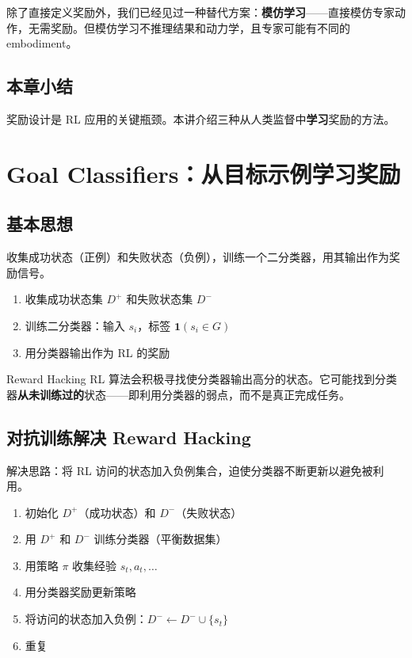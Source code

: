 \documentclass[a4paper]{article}
\begin{document}
除了直接定义奖励外，我们已经见过一种替代方案：\textbf{模仿学习}——直接模仿专家动作，无需奖励。但模仿学习不推理结果和动力学，且专家可能有不同的 embodiment。

\subsection{本章小结}

奖励设计是 RL 应用的关键瓶颈。本讲介绍三种从人类监督中\textbf{学习}奖励的方法。

\section{Goal Classifiers：从目标示例学习奖励}

\subsection{基本思想}

收集成功状态（正例）和失败状态（负例），训练一个二分类器，用其输出作为奖励信号。

\begin{enumerate}
    \item 收集成功状态集 $D^+$ 和失败状态集 $D^-$
    \item 训练二分类器：输入 $s_i$，标签 $\mathbf{1}(s_i \in G)$
    \item 用分类器输出作为 RL 的奖励
\end{enumerate}

\begin{warningbox}{Reward Hacking}
RL 算法会积极寻找使分类器输出高分的状态。它可能找到分类器\textbf{从未训练过的}状态——即利用分类器的弱点，而不是真正完成任务。
\end{warningbox}

\subsection{对抗训练解决 Reward Hacking}

解决思路：将 RL 访问的状态加入负例集合，迫使分类器不断更新以避免被利用。

\begin{enumerate}
    \item 初始化 $D^+$（成功状态）和 $D^-$（失败状态）
    \item 用 $D^+$ 和 $D^-$ 训练分类器（平衡数据集）
    \item 用策略 $\pi$ 收集经验 $s_t, a_t, \ldots$
    \item 用分类器奖励更新策略
    \item 将访问的状态加入负例：$D^- \leftarrow D^- \cup \{s_t\}$
    \item 重复
\end{enumerate}
\end{document}
